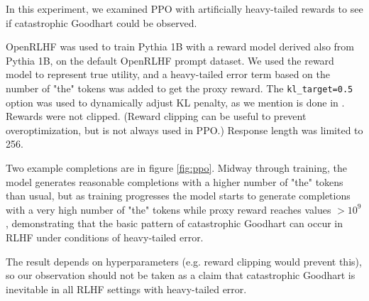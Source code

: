 \documentclass{article}
\begin{document}
In this experiment, we examined PPO with artificially heavy-tailed rewards to see if catastrophic Goodhart could be observed.

OpenRLHF \citep{hu2024openrlhf} was used to train Pythia 1B with a reward model derived also from Pythia 1B, on the default OpenRLHF prompt dataset.
We used the reward model to represent true utility, and a heavy-tailed error term based on the number of "the" tokens was added to get the proxy reward.
The \texttt{kl\_target=0.5} option was used to dynamically adjust KL penalty, as we mention is done in \citet{ziegler2020finetuning}.
Rewards were not clipped. (Reward clipping can be useful to prevent overoptimization, but is not always used in PPO.)
Response length was limited to 256.

Two example completions are in figure \ref{fig:ppo}. Midway through training, the model generates reasonable completions with a higher number of "the" tokens than usual, but as training progresses the model starts to generate completions with a very high number of "the" tokens while proxy reward reaches values $>10^9$, demonstrating that the basic pattern of catastrophic Goodhart can occur in RLHF under conditions of heavy-tailed error.

The result depends on hyperparameters (e.g. reward clipping would prevent this), so our observation should not be taken as a claim that catastrophic Goodhart is inevitable in all RLHF settings with heavy-tailed error.
\end{document}
